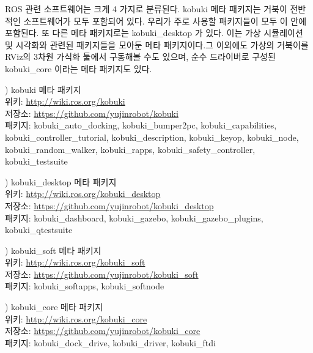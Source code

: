 ROS 관련 소프트웨어는 크게 4 가지로 분류된다. kobuki 메타 패키지는 거북이 전반적인 소프트웨어가 모두 포함되어 있다. 우리가 주로 사용할 패키지들이 모두 이 안에 포함된다. 또 다른 메타 패키지로는 kobuki\_desktop 가 있다. 이는 가상 시뮬레이션 및 시각화와 관련된 패키지들을 모아둔 메타 패키지이다.그 이외에도 가상의 거북이를 RViz의 3차원 가식화 툴에서 구동해볼 수도 있으며, 순수 드라이버로 구성된 kobuki\_core 이라는 메타 패키지도 있다.

\setcounter{num}{0}

\vspace{\baselineskip}
\noindent
{}
\thenum) kobuki 메타 패키지\\
위키: \url{http://wiki.ros.org/kobuki}\\
저장소: \url{https://github.com/yujinrobot/kobuki}\\
패키지: kobuki\_auto\_docking, kobuki\_bumper2pc, kobuki\_capabilities,\\
kobuki\_controller\_tutorial, kobuki\_description, kobuki\_keyop, kobuki\_node,\\
kobuki\_random\_walker, kobuki\_rapps, kobuki\_safety\_controller, kobuki\_testsuite

\vspace{\baselineskip}
\noindent
{}
\thenum) kobuki\_desktop 메타 패키지\\
위키: \url{http://wiki.ros.org/kobuki_desktop}\\
저장소: \url{https://github.com/yujinrobot/kobuki_desktop}\\
패키지: kobuki\_dashboard, kobuki\_gazebo, kobuki\_gazebo\_plugins, kobuki\_qtestsuite

\vspace{\baselineskip}
\noindent
{}
\thenum) kobuki\_soft 메타 패키지\\
위키: \url{http://wiki.ros.org/kobuki_soft}\\
저장소: \url{https://github.com/yujinrobot/kobuki_soft}\\
패키지: kobuki\_softapps, kobuki\_softnode

\vspace{\baselineskip}
\noindent
{}
\thenum) kobuki\_core 메타 패키지\\
위키: \url{http://wiki.ros.org/kobuki_core}\\
저장소: \url{https://github.com/yujinrobot/kobuki_core}\\
패키지: kobuki\_dock\_drive, kobuki\_driver, kobuki\_ftdi

